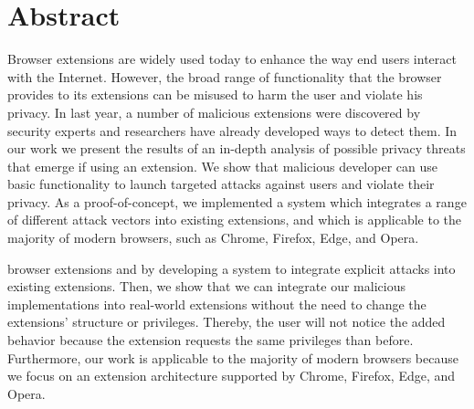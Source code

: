 \documentclass[parskip=full,bigchapter,linedtoc,colorback,accentcolor=tud9c,type=bsc]{tudthesis}
\begin{document}
	
	\author{Arno Manfred Krause}
	\makethesistitle
	
	
	\section*{Abstract}
	
	Browser extensions are widely used today to enhance the way end users interact with the Internet. However, the broad range of functionality that the browser provides to its extensions can be misused to harm the user and violate his privacy. In last year, a number of malicious extensions were discovered by security experts and researchers have already developed ways to detect them. In our work we present the results of an in-depth analysis of possible privacy threats that emerge if using an extension. We show that malicious developer can use basic functionality to launch targeted attacks against users and violate their privacy. As a proof-of-concept, we implemented a system which integrates a range of different attack vectors into existing extensions, and which is applicable to the majority of modern browsers, such as Chrome, Firefox, Edge, and Opera.  
	
	
	
	 browser extensions and  by developing a system to integrate explicit attacks into existing extensions. Then, we show that we can integrate our malicious implementations into real-world extensions without the need to change the extensions' structure or privileges. Thereby, the user will not notice the added behavior because the extension requests the same privileges than before. Furthermore, our work is applicable to the majority of modern browsers because we focus on an extension architecture supported by Chrome, Firefox, Edge, and Opera.
	
	
	\tableofcontents
	\newpage
	
	
	
	
	
	
	
	
	
	
	
	
	
	
	
	
	
	
	
	
%
%
%
%
%


	\appendix
	
	
	
\end{document}
